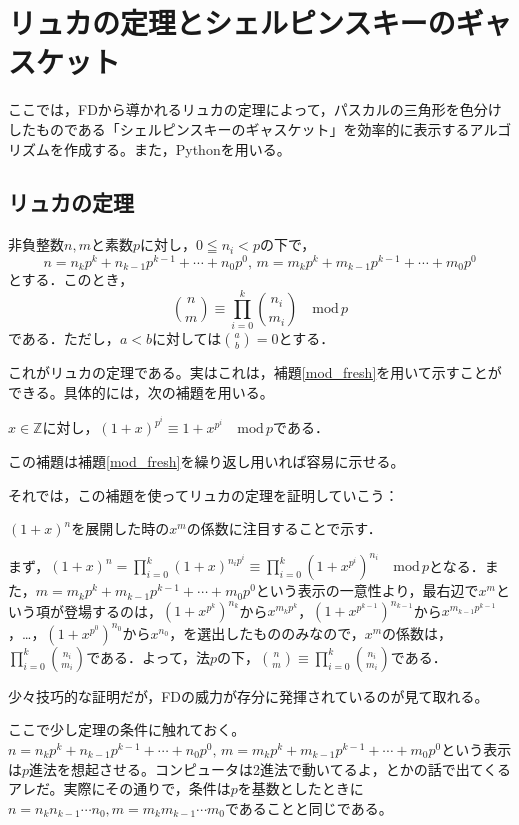 \section{リュカの定理とシェルピンスキーのギャスケット}

ここでは，\textsf{FD}から導かれるリュカの定理によって，パスカルの三角形を色分けしたものである「シェルピンスキーのギャスケット」を効率的に表示するアルゴリズムを作成する。また，Pythonを用いる。

\subsection{リュカの定理}
\begin{thm}[Lucas]
    非負整数$n,m$と素数$p$に対し，$0 \leqq n_i< p$の下で，\[
    n=n_kp^k+n_{k-1}p^{k-1}+\cdots+n_0p^0,\,m=m_kp^k+m_{k-1}p^{k-1}+\cdots+m_0p^0
    \]
    とする．このとき，\[
    \binom{n}{m}\equiv \prod_{i=0}^{k} \binom{n_i}{m_i} \quad \mathrm{mod}\, p
    \]
    である．ただし，$a<b$に対しては$\binom{a}{b}=0$とする．
\end{thm}

これがリュカの定理である。実はこれは，補題\ref{mod_fresh}を用いて示すことができる。具体的には，次の補題を用いる。
\begin{lemma}[\textsf{FD}]\label{mod_fresh_sec}
    $x\in\mathds{Z}$に対し，$(1+x)^{p^i}\equiv 1+x^{p^i} \quad \mathrm{mod}\,p$である．
\end{lemma}

この補題は補題\ref{mod_fresh}を繰り返し用いれば容易に示せる。

それでは，この補題を使ってリュカの定理を証明していこう：
\begin{prf}
    $(1+x)^n$を展開した時の$x^m$の係数に注目することで示す．

    まず，$(1+x)^n=\prod_{i=0}^{k}(1+x)^{n_ip^i}\equiv\prod_{i=0}^{k}(1+x^{p^i})^{n_i}\quad \mathrm{mod}\,p$となる．また，$m=m_kp^k+m_{k-1}p^{k-1}+\cdots+m_0p^0$という表示の一意性より，最右辺で$x^m$という項が登場するのは，$(1+x^{p^k})^{n_k}$から$x^{m_kp^k}$，$(1+x^{p^{k-1}})^{n_{k-1}}$から$x^{m_{k-1}p^{k-1}}$，\dots，$(1+x^{p^0})^{n_0}$から$x^{n_0}$，を選出したもののみなので，$x^m$の係数は，$\prod_{i=0}^{k}\binom{n_i}{m_i}$である．よって，法$p$の下，$\binom{n}{m}\equiv\prod_{i=0}^{k}\binom{n_i}{m_i}$である．
\end{prf}

少々技巧的な証明だが，\textsf{FD}の威力が存分に発揮されているのが見て取れる。

ここで少し定理の条件に触れておく。$n=n_kp^k+n_{k-1}p^{k-1}+\cdots+n_0p^0,\,m=m_kp^k+m_{k-1}p^{k-1}+\cdots+m_0p^0$という表示は$p$進法を想起させる。コンピュータは2進法で動いてるよ，とかの話で出てくるアレだ。実際にその通りで，条件は$p$を基数としたときに$n=n_kn_{k-1}\cdots n_0,m=m_km_{k-1}\cdots m_0$であることと同じである。

